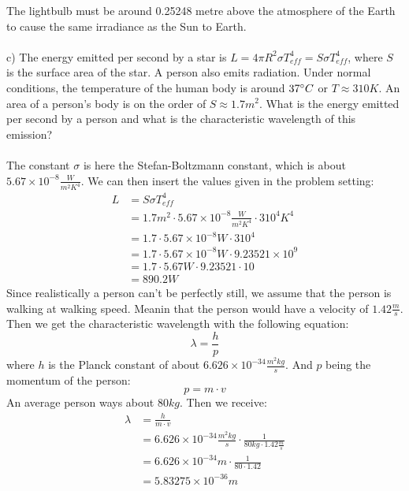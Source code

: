 The lightbulb must be around 0.25248 metre above the atmosphere of the Earth to cause the same irradiance
as the Sun to Earth.\\
\\
c) The energy emitted per second by a star is $L = 4 \pi R^2 \sigma T^4_{eff} = S \sigma T^4_{eff}$, where
$S$ is the surface area of the star. A person also emits radiation. Under normal conditions, the 
temperature of the human body is around $37 \degree C$ or $T \approx 310 K$. An area of a person's body
is on the order of $S \approx 1.7 m^2$. What is the energy emitted per second by a person and what is the
characteristic wavelength of this emission?\\
\\
The constant $\sigma$ is here the Stefan-Boltzmann constant, which is about 
$5.67 \times 10^{-8} \frac{W}{m^2K^4}$. We can then insert the values given in the problem setting:
\begin{equation*}
    \begin{split}
        L &= S \sigma T^4_{eff}\\
          &= 1.7 m^2 \cdot 5.67 \times 10^{-8} \frac{W}{m^2K^4} \cdot 310^4 K^4\\
          &= 1.7 \cdot 5.67 \times 10^{-8} W \cdot 310^4\\
          &= 1.7 \cdot 5.67 \times 10^{-8} W \cdot 9.23521 \times 10^9\\
          &= 1.7 \cdot 5.67 W \cdot 9.23521 \cdot 10\\
          &= 890.2 W
    \end{split}
\end{equation*}
Since realistically a person can't be perfectly still, we assume that the person is walking at walking
speed. Meanin that the person would have a velocity of $1.42 \frac{m}{s}$. Then we get the characteristic
wavelength with the following equation:
\begin{equation*}
    \lambda = \frac{h}{p}
\end{equation*}
where $h$ is the Planck constant of about $6.626 \times 10^{-34} \frac{m^2 kg}{s}$. And $p$ being the
momentum of the person:
\begin{equation*}
    p = m \cdot v
\end{equation*}
An average person ways about $80 kg$. Then we receive:
\begin{equation*}
    \begin{split}
        \lambda &= \frac{h}{m \cdot v}\\
                &= 6.626 \times 10^{-34} \frac{m^2 kg}{s} \cdot \frac{1}{80 kg \cdot 1.42 \frac{m}{s}}\\
                &= 6.626 \times 10^{-34} m \cdot \frac{1}{80 \cdot 1.42}\\
                &= 5.83275 \times 10^{-36} m
    \end{split}
\end{equation*}
